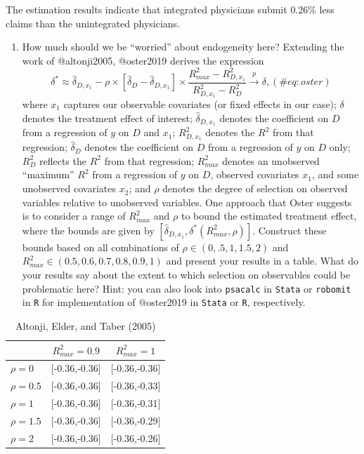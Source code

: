 \documentclass[
  12pt,
]{article}
\providecommand{\tightlist}{%
  \setlength{\itemsep}{0pt}\setlength{\parskip}{0pt}}
\begin{document}
The estimation results indicate that integrated physicians submit
\(0.26\%\) less claims than the unintegrated physicians.

\begin{enumerate}
\def\labelenumi{\arabic{enumi}.}
\setcounter{enumi}{3}
\tightlist
\item
  How much should we be ``worried'' about endogeneity here? Extending
  the work of @altonji2005, @oster2019 derives the expression
  \begin{equation}
   \delta^{*} \approx \hat{\delta}_{D,x_{1}} - \rho \times \left[\hat{\delta}_{D} - \hat{\delta}_{D,x_{1}}\right] \times \frac{R_{max}^{2} - R_{D,x_{1}}^{2}}{R_{D,x_{1}}^{2} - R_{D}^{2}} \xrightarrow{p} \delta,
   (\#eq:oster)
   \end{equation} where \(x_{1}\) captures our observable covariates (or
  fixed effects in our case); \(\delta\) denotes the treatment effect of
  interest; \(\hat{\delta}_{D,x_{1}}\) denotes the coefficient on \(D\)
  from a regression of \(y\) on \(D\) and \(x_{1}\); \(R_{D,x_{1}}^{2}\)
  denotes the \(R^{2}\) from that regression; \(\hat{\delta}_{D}\)
  denotes the coefficient on \(D\) from a regression of \(y\) on \(D\)
  only; \(R_{D}^{2}\) reflects the \(R^{2}\) from that regression;
  \(R_{max}^{2}\) denotes an unobserved ``maximum'' \(R^{2}\) from a
  regression of \(y\) on \(D\), observed covariates \(x_{1}\), and some
  unobserved covariates \(x_{2}\); and \(\rho\) denotes the degree of
  selection on observed variables relative to unobserved variables. One
  approach that Oster suggests is to consider a range of \(R^{2}_{max}\)
  and \(\rho\) to bound the estimated treatment effect, where the bounds
  are given by
  \(\left[ \hat{\delta}_{D,x_{1}}, \delta^{*}(R^{2}_{max}, \rho) \right]\).
  Construct these bounds based on all combinations of
  \(\rho \in (0, .5, 1, 1.5, 2)\) and
  \(R_{max}^{2} \in (0.5, 0.6, 0.7, 0.8, 0.9, 1)\) and present your
  results in a table. What do your results say about the extent to which
  selection on observables could be problematic here? Hint: you can also
  look into \texttt{psacalc} in \texttt{Stata} or \texttt{robomit} in
  \texttt{R} for implementation of @oster2019 in \texttt{Stata} or
  \texttt{R}, respectively.
\end{enumerate}


\begin{table}[ht]
\centering
\begin{tabular}{lcc}
  \hline
 &  $R_{max}^2=0.9$ & $R_{max}^2=1$ \\ 
  \hline
$\rho=0$ & [-0.36,-0.36] & [-0.36,-0.36] \\ 
  $\rho=0.5$ & [-0.36,-0.36] & [-0.36,-0.33] \\ 
  $\rho=1$ & [-0.36,-0.36] & [-0.36,-0.31] \\ 
  $\rho=1.5$ & [-0.36,-0.36] & [-0.36,-0.29] \\ 
  $\rho=2$ & [-0.36,-0.36] & [-0.36,-0.26] \\ 
   \hline
\end{tabular}
\caption{Altonji, Elder, and Taber (2005)} 
\end{table}
\end{document}
